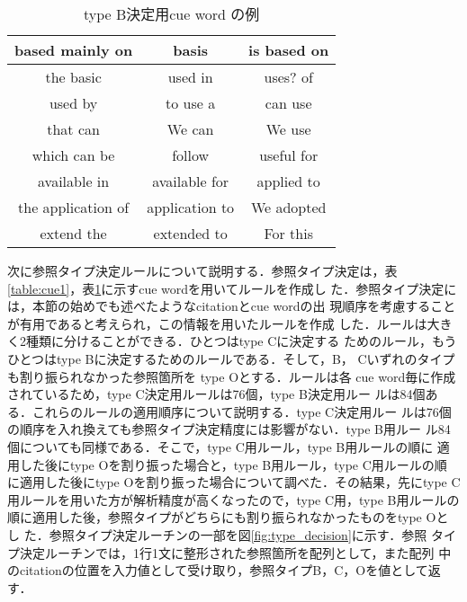 \begin{table}[t]
\caption{type B決定用cue word の例\label{table:cue2}}
\begin{center}
\begin{tabular}{|c|c|c|}\hline
 based mainly on & basis & is based on \\ \hline
 the basic & used in & uses? of \\ \hline
 used by & to use a & can use \\ \hline
 that can & We can & We use \\ \hline
 which can be & follow & useful for \\ \hline
 available in & available for & applied to \\ \hline
 the application of & application to & We adopted \\ \hline
 extend the & extended to & For this \\ \hline
\end{tabular}
\end{center}
\end{table}

次に参照タイプ決定ルールについて説明する．参照タイプ決定は，表
\ref{table:cue1}，表\ref{table:cue2}に示すcue wordを用いてルールを作成し
た．参照タイプ決定には，本節の始めでも述べたようなcitationとcue wordの出
現順序を考慮することが有用であると考えられ，この情報を用いたルールを作成
した．ルールは大きく2種類に分けることができる．ひとつはtype Cに決定する
ためのルール，もうひとつはtype Bに決定するためのルールである．そして，B，
Cいずれのタイプも割り振られなかった参照箇所を type Oとする．ルールは各
cue word毎に作成されているため，type C決定用ルールは76個，type B決定用ルー
ルは84個ある．これらのルールの適用順序について説明する．type C決定用ルー
ルは76個の順序を入れ換えても参照タイプ決定精度には影響がない．type B用ルー
ル84個についても同様である．そこで，type C用ルール，type B用ルールの順に
適用した後にtype Oを割り振った場合と，type B用ルール，type C用ルールの順
に適用した後にtype Oを割り振った場合について調べた．その結果，先にtype C
用ルールを用いた方が解析精度が高くなったので，type C用，type B用ルールの
順に適用した後，参照タイプがどちらにも割り振られなかったものをtype Oとし
た．参照タイプ決定ルーチンの一部を図\ref{fig:type_decision}に示す．参照
タイプ決定ルーチンでは，1行1文に整形された参照箇所を配列として，また配列
中のcitationの位置を入力値として受け取り，参照タイプB，C，Oを値として返
す．

